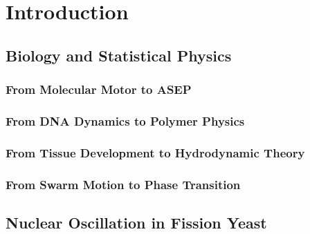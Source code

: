 
\chapter{Introduction}  %

\ifpdf
    \graphicspath{{Chapter1/Figs/Raster/}{Chapter1/Figs/PDF/}{Chapter1/Figs/}}
\else
    \graphicspath{{Chapter1/Figs/Vector/}{Chapter1/Figs/}}
\fi


\section{Biology and Statistical Physics} %
\label{sec:biology_and_statistical_physics}

\subsection{From Molecular Motor to ASEP}
\label{sub:from_molecular_motor_to_asep}

\subsection{From DNA Dynamics to Polymer Physics}
\label{sub:from_dna_to_polymer_physics}

\subsection{From Tissue Development to Hydrodynamic Theory}
\label{sub:from_tissue_development_to_hydrodynamic_theory}

\subsection{From Swarm Motion to Phase Transition}
\label{sub:from_swarm_Motion_to_phase_transition}





\section{Nuclear Oscillation in Fission Yeast} %
\label{sec:nuclear_oscillation_in_fission_yeast}


